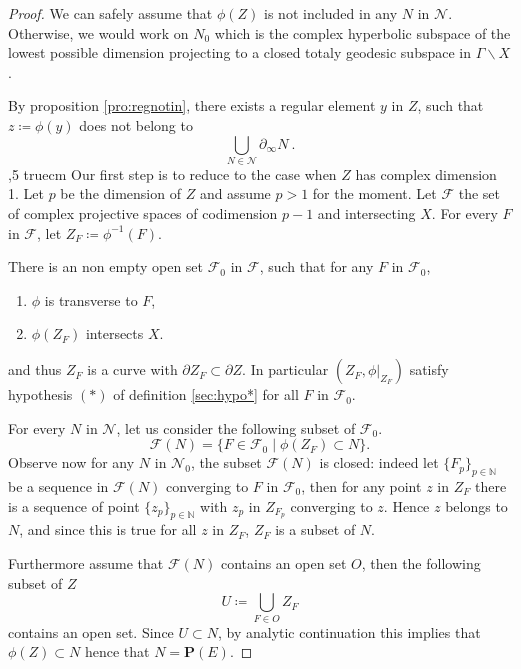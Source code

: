 \documentclass[12pt,reqno]{amsart}
\newcommand{\mc}{\mathcal}
\newcommand{\defeq}{\coloneqq}
\newcommand{\bP}{{\mathbf P}}
\newcommand{\seq}[1]{ \{{#1}_p\}_{p\in\mathbb N}}
\begin{document}
\begin{proof} 
We can safely assume that $\phi(Z)$ is not included in any $N$ in $\mc N$. Otherwise, we would work on $N_0$ which is the complex hyperbolic subspace of the lowest possible dimension projecting to a closed totaly geodesic subspace in $\Gamma\backslash X$.

By proposition \ref{pro:regnotin}, there exists a regular element $y$ in $Z$, such that $z\defeq\phi(y)$ does not belong to 
 $$
 \bigcup_{N\in\mc N}\partial_\infty N\ .$$  
 ,5 truecm
Our first step is to reduce to the case  when $Z$ has complex dimension 1. 
 Let $p$ be the dimension of $Z$ and assume $p>1$ for the moment. 
 Let  $\mc F$ the set of complex projective spaces of codimension $p-1$ and intersecting $X$. 
For every $F$ in $\mc F$, let $Z_F\defeq \phi^{-1}(F)$.

There is an non empty open set $\mc F_0$ in $\mc F$, such that for any $F$ in $\mc F_0$, 
\begin{enumerate}
	\item $\phi$ is transverse to $F$,
	\item $\phi(Z_F)$ intersects $X$.
\end{enumerate}
and thus $Z_F$ is a curve with $\partial Z_F\subset \partial Z$. In particular $(Z_F,\phi\vert_{Z_F})$ satisfy hypothesis $(*)$ of definition \ref{sec:hypo*} for all $F$ in $\mc F_0$.   

For every $N$ in $\mc N$, let us consider the following subset of $\mc F_0$.
$$
{\mc F}(N)=\{F\in \mc F_0\mid \phi(Z_F)\subset N\}.
$$ 
Observe now for any $N$ in $\mc N_0$, the subset  ${\mc F}(N)$ is closed: indeed let $\seq{F}$ be a sequence in  ${\mc F}(N)$ converging to $F$ in $\mc F_0$, then for any point $z$ in $Z_F$ there is a sequence of point $\seq{z}$ with $z_p$ in $Z_{F_p}$ converging to $z$. Hence $z$ belongs to $N$, and since this is true for all $z$ in $Z_F$, $Z_F$ is a subset of $N$.

Furthermore assume that   
${\mc F}(N)$ contains an open set $O$, then the following subset of $Z$
$$
U\defeq \bigcup_{F\in O}Z_F 
$$
contains an open set. Since $U\subset N$, by analytic continuation this implies that $\phi(Z)\subset N$ hence that $N=\bP(E)$. 


\end{proof}
\end{document}
